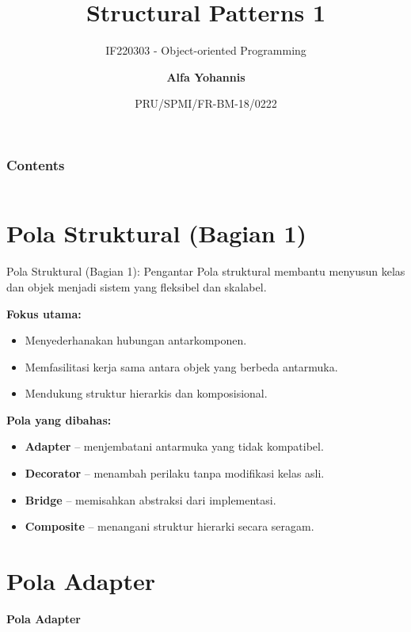 \documentclass[aspectratio=169, table]{beamer}
\subtitle{IF220303 - Object-oriented Programming}
\title{\Huge{Structural Patterns 1}\\\vspace{30pt}}
\date[Serial]{\scriptsize {PRU/SPMI/FR-BM-18/0222}}
\author[Pradita]{\small {\textbf{Alfa Yohannis}}}
\begin{document}
\frame{\titlepage}

\begin{frame}[fragile]
\frametitle{Contents}
\vspace{20pt}
\begin{columns}[t]
\tableofcontents[sections={1-2}]

\tableofcontents[sections={3-4}]
\end{columns}
\end{frame}


\section{Pola Struktural (Bagian 1)}

\begin{frame}[fragile]{Pola Struktural (Bagian 1): Pengantar}
	\vspace{20pt}
	Pola struktural membantu menyusun kelas dan objek menjadi sistem yang fleksibel dan skalabel.

	\textbf{Fokus utama:}
	\begin{itemize}
		\item Menyederhanakan hubungan antarkomponen.
		\item Memfasilitasi kerja sama antara objek yang berbeda antarmuka.
		\item Mendukung struktur hierarkis dan komposisional.
	\end{itemize}

	\textbf{Pola yang dibahas:}
	\begin{itemize}
		\item \textbf{Adapter} – menjembatani antarmuka yang tidak kompatibel.
		\item \textbf{Decorator} – menambah perilaku tanpa modifikasi kelas asli.
		\item \textbf{Bridge} – memisahkan abstraksi dari implementasi.
		\item \textbf{Composite} – menangani struktur hierarki secara seragam.
	\end{itemize}
\end{frame}


\section{Pola Adapter}

\begin{frame}{\hfill}
	\centering
	\textbf{\Huge{Pola Adapter}}
\end{frame}
\end{document}
